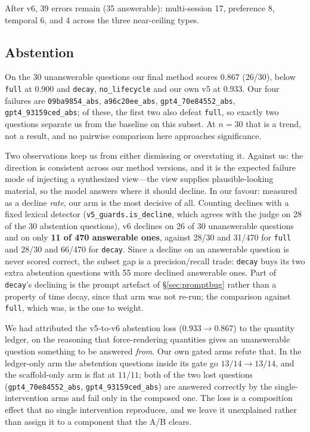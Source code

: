 \documentclass[11pt]{article}
\newcommand{\arm}[1]{\texttt{#1}}
\begin{document}
After v6, 39 errors remain (35 answerable): multi-session 17, preference 8, temporal 6, and 4 across the three near-ceiling types.

\subsection{Abstention}
\label{sec:abstention}

On the 30 unanswerable questions our final method scores $0.867$ (26/30), below \arm{full} at $0.900$ and \arm{decay}, \arm{no\_lifecycle} and our own v5 at $0.933$. Our four failures are \texttt{09ba9854\_abs}, \texttt{a96c20ee\_abs}, \texttt{gpt4\_70e84552\_abs}, \texttt{gpt4\_93159ced\_abs}; of these, the first two also defeat \arm{full}, so exactly two questions separate us from the baseline on this subset. At $n = 30$ that is a trend, not a result, and no pairwise comparison here approaches significance.

Two observations keep us from either dismissing or overstating it. Against us: the direction is consistent across our method versions, and it is the expected failure mode of injecting a synthesized view---the view supplies plausible-looking material, so the model answers where it should decline. In our favour: measured as a decline \emph{rate}, our arm is the most decisive of all. Counting declines with a fixed lexical detector (\texttt{v5\_guards.is\_decline}, which agrees with the judge on 28 of the 30 abstention questions), v6 declines on 26 of 30 unanswerable questions and on only \textbf{11 of 470 answerable ones}, against 28/30 and 31/470 for \arm{full} and 28/30 and 66/470 for \arm{decay}. Since a decline on an answerable question is never scored correct, the subset gap is a precision/recall trade: \arm{decay} buys its two extra abstention questions with 55 more declined answerable ones. Part of \arm{decay}'s declining is the prompt artefact of \S\ref{sec:promptbug} rather than a property of time decay, since that arm was not re-run; the comparison against \arm{full}, which was, is the one to weight.

We had attributed the v5-to-v6 abstention loss ($0.933 \rightarrow 0.867$) to the quantity ledger, on the reasoning that force-rendering quantities gives an unanswerable question something to be answered \emph{from}. Our own gated arms refute that. In the ledger-only arm the abstention questions inside its gate go $13/14 \rightarrow 13/14$, and the scaffold-only arm is flat at $11/11$; both of the two lost questions (\texttt{gpt4\_70e84552\_abs}, \texttt{gpt4\_93159ced\_abs}) are answered correctly by the single-intervention arms and fail only in the composed one. The loss is a composition effect that no single intervention reproduces, and we leave it unexplained rather than assign it to a component that the A/B clears.
\end{document}
